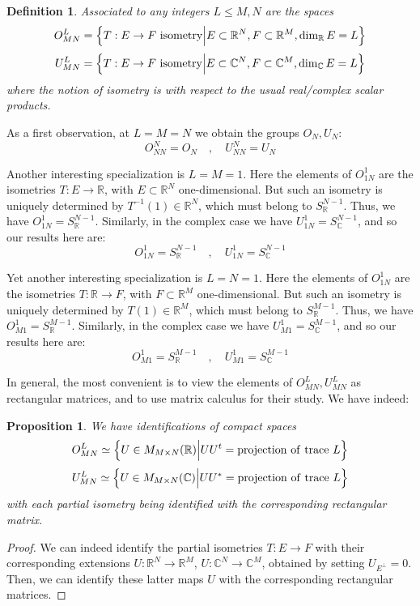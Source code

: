 \documentclass[12pt]{amsbook}
\newtheorem{definition}[theorem]{Definition}
\newtheorem{proposition}[theorem]{Proposition}
\begin{document}

\begin{definition}
Associated to any integers $L\leq M,N$ are the spaces
$$O_{MN}^L=\left\{T:E\to F\ {\rm isometry}\Big|E\subset\mathbb R^N,F\subset\mathbb R^M,\dim_\mathbb RE=L\right\}$$
$$U_{MN}^L=\left\{T:E\to F\ {\rm isometry}\Big|E\subset\mathbb C^N,F\subset\mathbb C^M,\dim_\mathbb CE=L\right\}$$
where the notion of isometry is with respect to the usual real/complex scalar products.
\end{definition}

As a first observation, at $L=M=N$ we obtain the groups $O_N,U_N$:
$$O_{NN}^N=O_N\quad,\quad 
U_{NN}^N=U_N$$ 

Another interesting specialization is $L=M=1$. Here the elements of $O_{1N}^1$ are the isometries $T:E\to\mathbb R$, with $E\subset\mathbb R^N$ one-dimensional. But such an isometry is uniquely determined by $T^{-1}(1)\in\mathbb R^N$, which must belong to $S^{N-1}_\mathbb R$. Thus, we have $O_{1N}^1=S^{N-1}_\mathbb R$. Similarly, in the complex case we have $U_{1N}^1=S^{N-1}_\mathbb C$, and so our results here are:
$$O_{1N}^1=S^{N-1}_\mathbb R\quad,\quad 
U_{1N}^1=S^{N-1}_\mathbb C$$

Yet another interesting specialization is $L=N=1$. Here the elements of $O_{1N}^1$ are the isometries $T:\mathbb R\to F$, with $F\subset\mathbb R^M$ one-dimensional. But such an isometry is uniquely determined by $T(1)\in\mathbb R^M$, which must belong to $S^{M-1}_\mathbb R$. Thus, we have $O_{M1}^1=S^{M-1}_\mathbb R$. Similarly, in the complex case we have $U_{M1}^1=S^{M-1}_\mathbb C$, and so our results here are:
$$O_{M1}^1=S^{M-1}_\mathbb R\quad,\quad
U_{M1}^1=S^{M-1}_\mathbb C$$

In general, the most convenient is to view the elements of $O_{MN}^L,U_{MN}^L$ as rectangular matrices, and to use matrix calculus for their study. We have indeed:

\begin{proposition}
We have identifications of compact spaces
$$O_{MN}^L\simeq\left\{U\in M_{M\times N}(\mathbb R)\Big|UU^t={\rm projection\ of\ trace}\ L\right\}$$
$$U_{MN}^L\simeq\left\{U\in M_{M\times N}(\mathbb C)\Big|UU^*={\rm projection\ of\ trace}\ L\right\}$$
with each partial isometry being identified with the corresponding rectangular matrix.
\end{proposition}

\begin{proof}
We can indeed identify the partial isometries $T:E\to F$ with their corresponding extensions $U:\mathbb R^N\to\mathbb R^M$, $U:\mathbb C^N\to\mathbb C^M$, obtained by setting $U_{E^\perp}=0$. Then, we can identify these latter maps $U$ with the corresponding rectangular matrices.
\end{proof}
\end{document}
